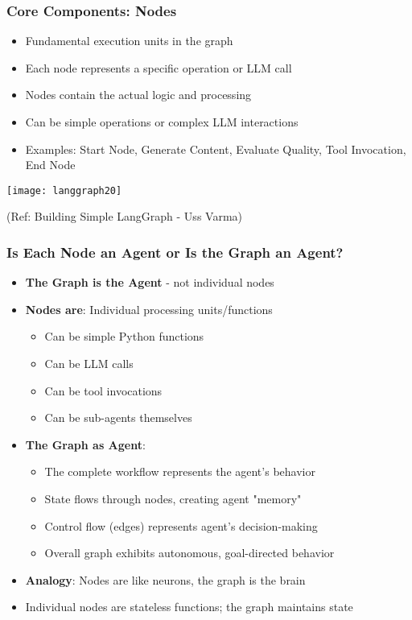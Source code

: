 \begin{frame}[fragile]\frametitle{Core Components: Nodes}

	  

      \begin{itemize}
        \item Fundamental execution units in the graph
        \item Each node represents a specific operation or LLM call
        \item Nodes contain the actual logic and processing
        \item Can be simple operations or complex LLM interactions
        \item Examples: Start Node, Generate Content, Evaluate Quality, Tool Invocation, End Node
      \end{itemize}


\begin{center}
\texttt{[image: langgraph20]}

{\tiny (Ref: Building Simple LangGraph - Uss Varma)}
\end{center}
  
\end{frame}

\begin{frame}[fragile]\frametitle{Is Each Node an Agent or Is the Graph an Agent?}
      \begin{itemize}
        \item \textbf{The Graph is the Agent} - not individual nodes
        \item \textbf{Nodes are}: Individual processing units/functions
        \begin{itemize}
            \item Can be simple Python functions
            \item Can be LLM calls
            \item Can be tool invocations
            \item Can be sub-agents themselves
        \end{itemize}
        \item \textbf{The Graph as Agent}:
        \begin{itemize}
            \item The complete workflow represents the agent's behavior
            \item State flows through nodes, creating agent "memory"
            \item Control flow (edges) represents agent's decision-making
            \item Overall graph exhibits autonomous, goal-directed behavior
        \end{itemize}
        \item \textbf{Analogy}: Nodes are like neurons, the graph is the brain
        \item Individual nodes are stateless functions; the graph maintains state
      \end{itemize}
\end{frame}

